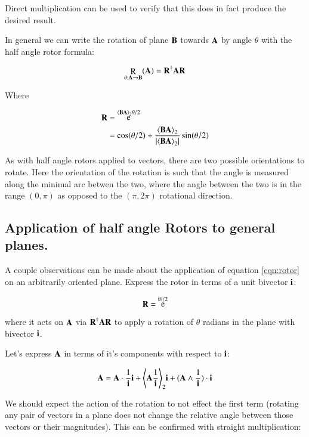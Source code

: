 \documentclass{article}      %
\DeclareMathOperator{\Exp}{e}
\DeclareMathOperator{\Rot}{R}
\newcommand{\gpgrade}[2] {{\left\langle{{#1}}\right\rangle}_{#2}}
\newcommand{\gpgradetwo}[1] {\gpgrade{#1}{2}}
\begin{document}
Direct multiplication can be used to verify that this does in fact produce the desired result.

In general we can write the rotation of plane $\mathbf{B}$ towards $\mathbf{A}$ by angle $\theta$ with the half angle rotor formula:

\begin{equation}\label{eqn:rotor}
\Rot_{\theta: \BA \rightarrow \BB}(\BA) = \BR^\dagger \BA \BR
\end{equation}

Where 

\begin{align*}
\BR 
&= \Exp^{\gpgradetwo{\BB \BA}\theta/2} \\
&= \cos(\theta/2) + \frac{\gpgradetwo{\BB \BA}}{\abs{\gpgradetwo{\BB \BA}}}\sin(\theta/2) \\
\end{align*}

As with half angle rotors applied to vectors, there are two possible orientations to rotate.  Here the orientation of the rotation is such that the angle is measured along the minimal arc betwen the two, where the angle between the two is in the range $(0,\pi)$ as opposed to the $(\pi,2\pi)$ rotational direction.

\subsection{ Application of half angle Rotors to general planes. }

A couple observations can be made about the application of equation \ref{eqn:rotor} on an arbitrarily oriented plane.  Express the rotor
in terms of a unit bivector $\mathbf{i}$:

\[
\BR = \Exp^{\Bi\theta/2}
\]

where it acts on $\mathbf{A}$ via $\mathbf{R}^\dagger \mathbf{A} \mathbf{R}$ to apply a rotation of $\theta$ radians in the plane with bivector $\mathbf{i}$.

Let's express $\mathbf{A}$ in terms of it's components with respect to $\mathbf{i}$:

\begin{equation}\label{eqn:Aicomponents}
\BA = \BA \cdot \inv{\Bi} \Bi + \gpgradetwo{\BA \inv{\Bi}} \Bi + (\BA \wedge \inv{\Bi}) \cdot \Bi
\end{equation}

We should expect the action of the rotation to not effect the first term (rotating any pair of vectors in a plane does not change the
relative angle between those vectors or their magnitudes).  This can be confirmed with straight multiplication:
\end{document}
